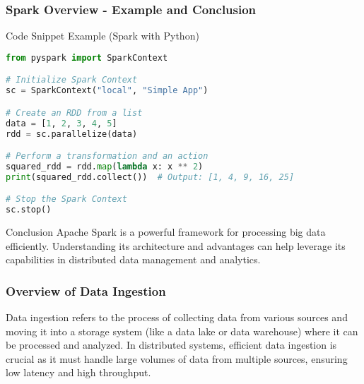 \documentclass[aspectratio=169]{beamer}
\begin{document}
\begin{frame}[fragile]
    \frametitle{Spark Overview - Example and Conclusion}
    \begin{block}{Code Snippet Example (Spark with Python)}
        \begin{lstlisting}[language=Python]
from pyspark import SparkContext

# Initialize Spark Context
sc = SparkContext("local", "Simple App")

# Create an RDD from a list
data = [1, 2, 3, 4, 5]
rdd = sc.parallelize(data)

# Perform a transformation and an action
squared_rdd = rdd.map(lambda x: x ** 2)
print(squared_rdd.collect())  # Output: [1, 4, 9, 16, 25]

# Stop the Spark Context
sc.stop()
        \end{lstlisting}
    \end{block}

    \begin{block}{Conclusion}
        Apache Spark is a powerful framework for processing big data efficiently. Understanding its architecture and advantages can help leverage its capabilities in distributed data management and analytics.
    \end{block}
\end{frame}

\begin{frame}[fragile]
  \frametitle{Overview of Data Ingestion}
  Data ingestion refers to the process of collecting data from various sources and moving it into a storage system (like a data lake or data warehouse) where it can be processed and analyzed. 
  In distributed systems, efficient data ingestion is crucial as it must handle large volumes of data from multiple sources, ensuring low latency and high throughput.
\end{frame}
\end{document}
